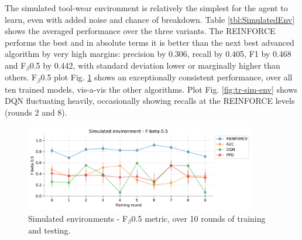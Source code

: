 \documentclass[a4paper, 12pt]{article}
\begin{document}
The simulated tool-wear environment is relatively the simplest for the agent to learn, even with added noise and chance of breakdown. Table \ref{tbl:SimulatedEnv} shows the averaged performance over the three variants. The REINFORCE performs the best and in absolute terms it is better than the next best advanced algorithm by very high margins: precision by 0.306, recall by 0.405, F1 by 0.468 and F$_\beta$0.5 by 0.442, with standard deviation lower or marginally higher than others. F$_\beta$0.5 plot Fig. \ref{fig:FbetaSimulated} shows an exceptionally consistent performance, over all ten trained models, vis-a-vis the other algorithms. Plot Fig. \ref{fig:tr-sim-env} shows DQN fluctuating heavily, occasionally showing recalls at the REINFORCE levels (rounds 2 and 8).
\begin{figure}[h]
	\centering
	\includegraphics[width=0.9\textwidth]{Simulated_F05.pdf}  
	\caption{Simulated environments - F$_\beta$0.5 metric, over 10 rounds of training and testing.}
	\label{fig:FbetaSimulated}
\end{figure}
\end{document}
